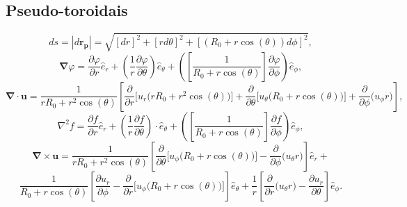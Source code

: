 \documentclass[12pt,oneside,a4paper]{abntex2}
\begin{document}
\subsection*{Pseudo-toroidais}
\begin{equation}
ds=|d\bm{r_p}| = \sqrt{[dr]^2+  [r d\theta ]^2+[(R_0+r \cos(\theta)) d\phi ]^2},
\end{equation}
\begin{equation}
\bm{\nabla} \varphi = \dfrac{\partial \varphi}{\partial r}  \hat{e}_r + \left(\frac{1}{r}\dfrac{\partial \varphi}{\partial \theta} \right) \hat{e}_\theta + \left( \left[ \frac{1}{ R_0 + r \cos(\theta)}\right] \dfrac{\partial \varphi}{\partial \phi}\right) \hat{e}_\phi,
\end{equation}
\begin{equation}
\bm{\nabla} \cdot \bm{u} = \frac{1}{r R_0 + r^2 \cos(\theta)} \left[ \dfrac{\partial}{\partial r} \Big[u_r \big(r R_0 + r^2 \cos(\theta)\big)\Big] + \dfrac{\partial}{\partial \theta}\Big[ u_\theta \big( R_0 + r \cos(\theta) \big) \Big] +  \dfrac{\partial }{\partial \phi}\big( u_\phi  r \big) \right],
\end{equation}
\begin{equation}
\nabla^2 f = \dfrac{\partial f}{\partial r}  \hat{e}_r + \left(\frac{1}{r}\dfrac{\partial f}{\partial \theta} \right) \cdot \hat{e}_\theta + \left( \left[ \frac{1}{ R_0 + r \cos(\theta)}\right] \dfrac{\partial f}{\partial \phi}\right)  \hat{e}_\phi,
\end{equation}
\begin{equation}
\bm{\nabla} \times \bm{u} = \frac{1}{r R_0 + r^2 \cos(\theta)} \left[ \dfrac{\partial }{\partial \theta} \Big[ u_\phi \big(R_0 + r \cos(\theta)\big)\Big] - \dfrac{\partial }{\partial \phi} \big( u_\theta r \big) \right] \hat{e}_r+
\end{equation}
\begin{equation*}
\frac{1}{R_0 + r \cos(\theta)} \left[ \dfrac{\partial u_r}{\partial \phi} - \dfrac{\partial }{\partial r} \Big[ u_\phi  \big( R_0 + r \cos(\theta) \big) \Big] \right] \hat{e}_\theta+\frac{1}{r} \left[ \dfrac{\partial }{\partial r}\big( u_\theta  r\big) - \dfrac{\partial u_r}{\partial \theta}  \right] \hat{e}_\phi.
\end{equation*}
\end{document}

